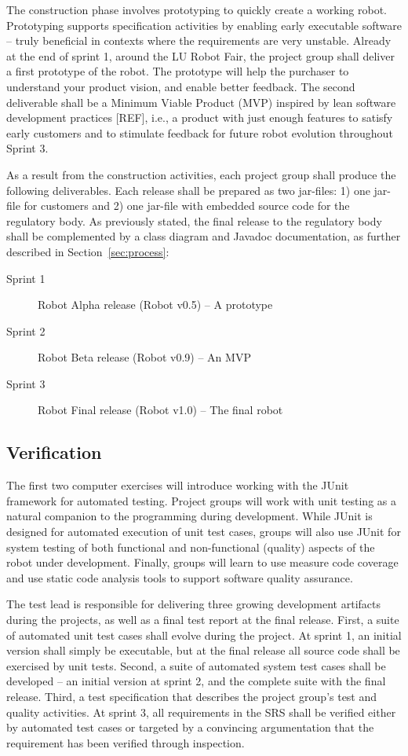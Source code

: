 \documentclass{scrreprt}
\begin{document}
\begin{description}
\end{description}

The construction phase involves prototyping to quickly create a working robot. Prototyping supports specification activities by enabling early executable software -- truly beneficial in contexts where the requirements are very unstable. Already at the end of sprint 1, around the LU Robot Fair, the project group shall deliver a first prototype of the robot. The prototype will help the purchaser to understand your product vision, and enable better feedback. The second deliverable shall be a Minimum Viable Product (MVP) inspired by lean software development practices [REF], i.e., a product with just enough features to satisfy early customers and to stimulate feedback for future robot evolution throughout Sprint 3. 

As a result from the construction activities, each project group shall produce the following deliverables. Each release shall be prepared as two jar-files: 1) one jar-file for customers and 2) one jar-file with embedded source code for the regulatory body. As previously stated, the final release to the regulatory body shall be complemented by a class diagram and Javadoc documentation, as further described in Section~\ref{sec:process}:
\begin{description}
\item[Sprint 1] Robot Alpha release (Robot v0.5) -- A prototype
\item[Sprint 2] Robot Beta release (Robot v0.9) -- An MVP
\item[Sprint 3] Robot Final release (Robot v1.0) -- The final robot
\end{description}

\subsection{Verification}
The first two computer exercises will introduce working with the JUnit framework for automated testing. Project groups will work with unit testing as a natural companion to the programming during development. While JUnit is designed for automated execution of unit test cases, groups will also use JUnit for system testing of both functional and non-functional (quality) aspects of the robot under development. Finally, groups will learn to use measure code coverage and use static code analysis tools to support software quality assurance.

The test lead is responsible for delivering three growing development artifacts during the projects, as well as a final test report at the final release. First, a suite of automated unit test cases shall evolve during the project. At sprint 1, an initial version shall simply be executable, but at the final release all source code shall be exercised by unit tests. Second, a suite of automated system test cases shall be developed -- an initial version at sprint 2, and the complete suite with the final release. Third, a test specification that describes the project group's test and quality activities. At sprint 3, all requirements in the SRS shall be verified either by automated test cases or targeted by a convincing argumentation that the requirement has been verified through inspection.
\end{document}
